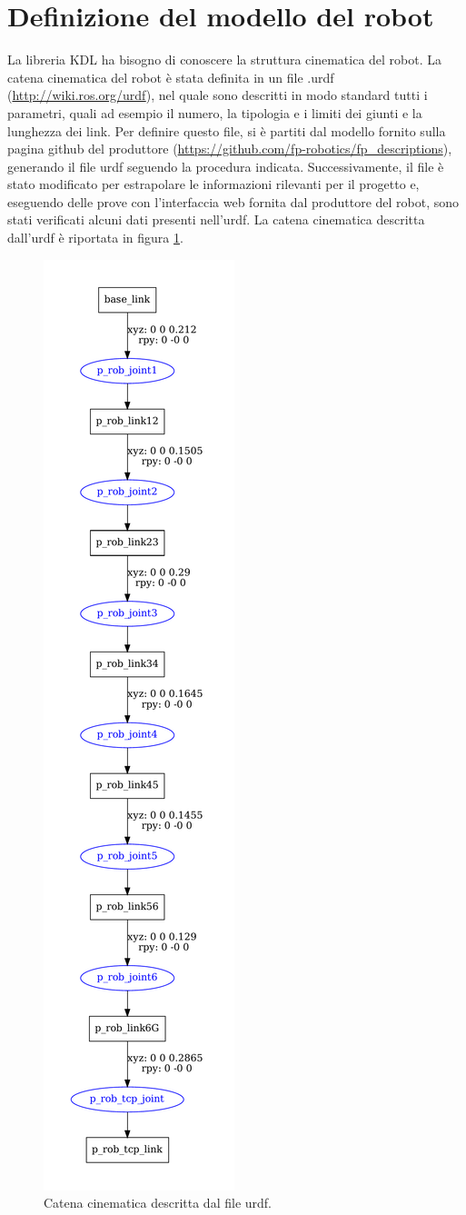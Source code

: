 \section{Definizione del modello del robot}
La libreria KDL ha bisogno di conoscere la struttura cinematica del robot. La catena cinematica del robot è stata definita in un file .urdf (\url{http://wiki.ros.org/urdf}), nel quale sono descritti in modo standard tutti i parametri, quali ad esempio il numero, la tipologia e i limiti dei giunti e la lunghezza dei link. Per definire questo file, si è partiti dal modello fornito sulla pagina github del produttore (\url{https://github.com/fp-robotics/fp_descriptions}), generando il file urdf seguendo la procedura indicata. Successivamente, il file è stato modificato per estrapolare le informazioni rilevanti per il progetto e, eseguendo delle prove con l'interfaccia web fornita dal produttore del robot, sono stati verificati alcuni dati presenti nell'urdf. La catena cinematica descritta dall'urdf è riportata in figura \ref{fig:urdf_prob3}.
\begin{figure}[tbh]
	\centering
	\includegraphics[width=0.3\linewidth]{./OtherFiles/p_rob.pdf}
	\caption{Catena cinematica descritta dal file urdf.}
	\label{fig:urdf_prob3}
\end{figure}
